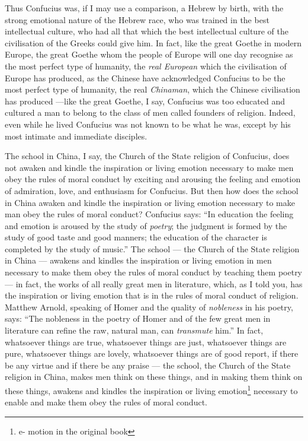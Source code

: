 Thus Confucius was, if I may use a comparison, a Hebrew by birth, with the strong emotional nature of the Hebrew race, who was trained in the best intellectual culture, who had all that which the best intellectual culture of the civilisation of the Greeks could give him.
In fact, like the great Goethe in modern Europe, the great Goethe whom the people of Europe will one day recognise as the most perfect type of humanity, the \emph{real European} which the civilisation of Europe has produced, as the Chinese have acknowledged Confucius to be the most perfect type of humanity, the real \emph{Chinaman}, which the Chinese civilisation has produced ---like the great Goethe, I say, Confucius was too educated and cultured a man to belong to the class of men called founders of religion.
Indeed, even while he lived Confucius was not known to be what he was, except by his most intimate and immediate disciples.

The school in China, I say, the Church of the State religion of Confucius, does not awaken and kindle the inspiration or living emotion necessary to make men obey the rules of moral conduct by exciting and arousing the feeling and emotion of admiration, love, and enthusiasm for Confucius.
But then how does the school in China awaken and kindle the inspiration or living emotion necessary to make man obey the rules of moral conduct?
Confucius says: ``In education the feeling and emotion is aroused by the study of \emph{poetry}; the judgment  is formed by the study of good taste and good manners; the education of the character is completed by the study of music.''
The school --- the Church of the State religion in China --- awakens and kindles the inspiration or living emotion in men necessary to make them obey the rules of moral conduct by teaching them poetry --- in fact, the works of all really great men in literature, which, as I told you, has the inspiration or living emotion that is in the rules of moral conduct of religion.
Matthew Arnold, speaking of Homer  and the quality of \emph{nobleness} in his poetry, says: ``The nobleness in the poetry of Homer and of the few great men in literature can refine the raw, natural man, can \emph{transmute} him.''
In fact, whatsoever things are true, whatsoever things are just, whatsoever things are pure, whatsoever things are lovely, whatsoever things are of good report, if there be any virtue and if there be any praise --- the school, the Church of the State religion in China, makes men think on these things, and in making them think on these things, awakens and kindles the inspiration or living emotion\footnote{e- motion in the original book} necessary to enable and make them obey the rules of moral conduct.

